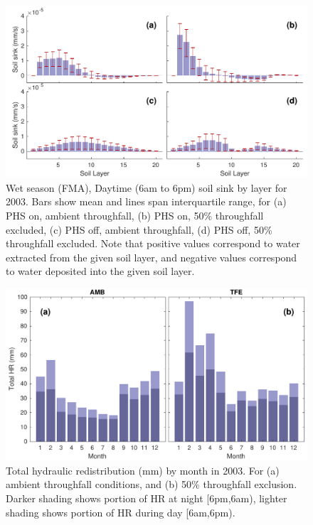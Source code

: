 \documentclass[draft,linenumbers]{agujournal}
\begin{document}
        \clearpage
    \begin{figure}[h]
     \centering
     \includegraphics[width=30pc]{../figs/fig8.pdf}
     \caption{Wet season (FMA), Daytime (6am to 6pm) soil sink by layer for 2003. 
     Bars show mean and lines span interquartile range, for 
     (a) PHS on, ambient throughfall,
     (b) PHS on, 50\% throughfall excluded,
     (c) PHS off, ambient throughfall,
     (d) PHS off, 50\% throughfall excluded. 
     Note that positive values correspond to water extracted from the given soil layer, 
     and negative values correspond to water deposited into the given soil layer.}
     \label{fig8}
  \end{figure}
  
    \clearpage
    \begin{figure}[h]
     \centering
     \includegraphics[width=30pc]{../figs/fig9.pdf}
     \caption{Total hydraulic redistribution (mm) by month in 2003. For (a) ambient throughfall conditions, and (b) 50\% throughfall exclusion. 
     Darker shading shows portion of HR at night [6pm,6am), lighter shading shows portion of HR during day [6am,6pm).}
     \label{fig9}
  \end{figure}
  
\end{document}
